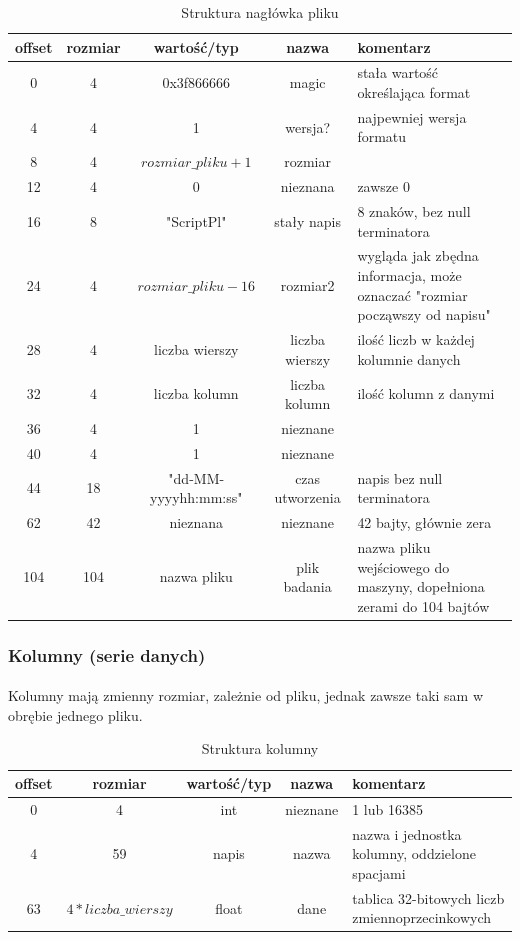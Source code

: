 \documentclass[12pt]{report}
\begin{document}
	\begin{table}[H]
		\centering
		\caption{Struktura nagłówka pliku}
		\begin{tabular}{|c|c|c|c|p{5.5cm}|} \hline
			offset & rozmiar & wartość/typ & nazwa & komentarz \\\hline
			\hline
			0 &  4 & 0x3f866666 & magic & stała wartość określająca format \\\hline
			4 &  4 & 1 & wersja? & najpewniej wersja formatu \\\hline
			8 &  4 & $rozmiar\_pliku + 1$ & rozmiar & \\\hline
			12 &  4 & 0 & nieznana & zawsze 0 \\\hline
			16 &  8 & "ScriptPl" & stały napis & 8 znaków, bez null terminatora \\\hline
			24 &  4 & $rozmiar\_pliku - 16$ & rozmiar2 & wygląda jak zbędna informacja, może oznaczać "rozmiar począwszy od napisu" \\\hline
			28 &  4 & liczba wierszy & liczba wierszy & ilość liczb w każdej kolumnie danych \\\hline
			32 &  4 & liczba kolumn & liczba kolumn & ilość kolumn z danymi \\\hline
			36 &  4 & 1 & nieznane & \\\hline
			40 &  4 & 1 & nieznane & \\\hline
			44 & 18 & "dd-MM-yyyyhh:mm:ss" & czas utworzenia & napis bez null terminatora \\\hline
			62 & 42 & nieznana & nieznane & 42 bajty, głównie zera \\\hline
			104 & 104 & nazwa pliku & plik badania & nazwa pliku wejściowego do maszyny, dopełniona zerami do 104 bajtów \\\hline
		\end{tabular}
	\end{table}
	
	\pagebreak
	\subsubsection{Kolumny (serie danych)}
	\paragraph{}
	Kolumny mają zmienny rozmiar, zależnie od pliku, jednak zawsze taki sam w obrębie jednego pliku.
	
	\begin{table}[H]
		\centering
		\caption{Struktura kolumny}
		\begin{tabular}{|c|c|c|c|p{6.5cm}|} \hline
			offset & rozmiar & wartość/typ & nazwa & komentarz \\\hline
			\hline
			0 & 4 & int & nieznane & 1 lub 16385  \\\hline
			4 & 59 & napis & nazwa & nazwa i jednostka kolumny, oddzielone spacjami \\\hline
			63 & $4 * liczba\_wierszy$ & float & dane & tablica 32-bitowych liczb zmiennoprzecinkowych \\\hline
		\end{tabular}
	\end{table}
	
\end{document}

